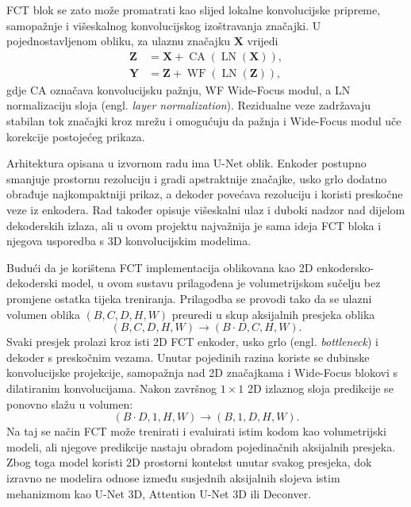 \documentclass[a4paper,12pt,oneside]{article}
\begin{document}
FCT blok se zato može promatrati kao slijed lokalne konvolucijske pripreme, samopažnje i višeskalnog konvolucijskog izoštravanja značajki. U pojednostavljenom obliku, za ulaznu značajku $\mathbf{X}$ vrijedi
\begin{align}
\mathbf{Z} &= \mathbf{X} + \operatorname{CA}(\operatorname{LN}(\mathbf{X})), \label{eq:fct_block_attention}\\
\mathbf{Y} &= \mathbf{Z} + \operatorname{WF}(\operatorname{LN}(\mathbf{Z})), \label{eq:fct_block_wf}
\end{align}
gdje CA označava konvolucijsku pažnju, WF Wide-Focus modul, a LN normalizaciju sloja (engl. \textit{layer normalization}). Rezidualne veze zadržavaju stabilan tok značajki kroz mrežu i omogućuju da pažnja i Wide-Focus modul uče korekcije postojećeg prikaza.

Arhitektura opisana u izvornom radu ima U-Net oblik. Enkoder postupno smanjuje prostornu rezoluciju i gradi apstraktnije značajke, usko grlo dodatno obrađuje najkompaktniji prikaz, a dekoder povećava rezoluciju i koristi preskočne veze iz enkodera. Rad također opisuje višeskalni ulaz i duboki nadzor nad dijelom dekoderskih izlaza, ali u ovom projektu najvažnija je sama ideja FCT bloka i njegova usporedba s 3D konvolucijskim modelima.

Budući da je korištena FCT implementacija oblikovana kao 2D enkodersko-dekoderski model, u ovom sustavu prilagođena je volumetrijskom sučelju bez promjene ostatka tijeka treniranja. Prilagodba se provodi tako da se ulazni volumen oblika $(B, C, D, H, W)$ preuredi u skup aksijalnih presjeka oblika
\begin{equation}\label{eq:fct_volume_to_slices}
(B, C, D, H, W) \rightarrow (B \cdot D, C, H, W).
\end{equation}
Svaki presjek prolazi kroz isti 2D FCT enkoder, usko grlo (engl. \textit{bottleneck}) i dekoder s preskočnim vezama. Unutar pojedinih razina koriste se dubinske konvolucijske projekcije, samopažnja nad 2D značajkama i Wide-Focus blokovi s dilatiranim konvolucijama. Nakon završnog $1 \times 1$ 2D izlaznog sloja predikcije se ponovno slažu u volumen:
\begin{equation}\label{eq:fct_slices_to_volume}
(B \cdot D, 1, H, W) \rightarrow (B, 1, D, H, W).
\end{equation}
Na taj se način FCT može trenirati i evaluirati istim kodom kao volumetrijski modeli, ali njegove predikcije nastaju obradom pojedinačnih aksijalnih presjeka. Zbog toga model koristi 2D prostorni kontekst unutar svakog presjeka, dok izravno ne modelira odnose između susjednih aksijalnih slojeva istim mehanizmom kao U-Net 3D, Attention U-Net 3D ili Deconver.
\end{document}
